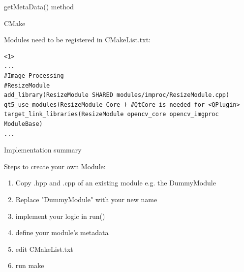 \documentclass{beamer}
\begin{document}
\begin{frame}[fragile]{getMetaData() method}

\begin{linehighlight}{
}
      
\end{linehighlight}

\end{frame}


\begin{frame}[fragile]{CMake}

Modules need to be registered in CMakeList.txt: \newline

	\begin{lstlisting}<1>
...
#Image Processing
#ResizeModule
add_library(ResizeModule SHARED modules/improc/ResizeModule.cpp)
qt5_use_modules(ResizeModule Core ) #QtCore is needed for <QPlugin>
target_link_libraries(ResizeModule opencv_core opencv_imgproc ModuleBase)
...
	\end{lstlisting}


	\pnote{
	}

\end{frame}

\begin{frame}[fragile]{Implementation summary}

Steps to create your own Module:
	\begin{enumerate}
		\item Copy .hpp and .cpp of an existing module e.g. the DummyModule \pause
		\item Replace "DummyModule" with your new name \pause
		\item implement your logic in run()  \pause
		\item define your module's metadata \pause
		\item edit CMakeList.txt \pause
		\item run make
	\end{enumerate}


	\pnote{
	}

\end{frame}



\end{document}
